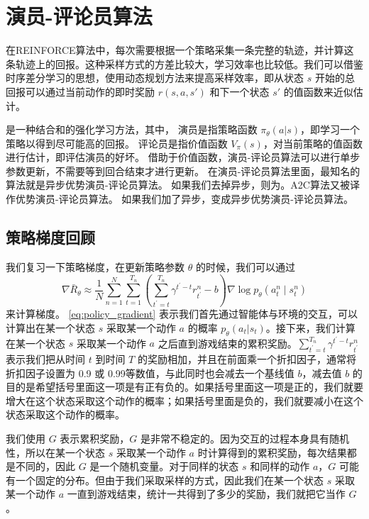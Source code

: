 \section{演员-评论员算法}
在REINFORCE算法中，每次需要根据一个策略采集一条完整的轨迹，并计算这条轨迹上的回报。这种采样方式的方差比较大，学习效率也比较低。我们可以借鉴时序差分学习的思想，使用动态规划方法来提高采样效率，即从状态 $s$ 开始的总回报可以通过当前动作的即时奖励 $r(s,a,s')$ 和下一个状态 $s'$ 的值函数来近似估计。

是一种结合和的强化学习方法，其中，
演员是指策略函数 $\pi_{\theta}(a|s)$，即学习一个策略以得到尽可能高的回报。
评论员是指价值函数 $V_{\pi}(s)$，对当前策略的值函数进行估计，即评估演员的好坏。
借助于价值函数，演员-评论员算法可以进行单步参数更新，不需要等到回合结束才进行更新。
在演员-评论员算法里面，最知名的算法就是异步优势演员-评论员算法。
如果我们去掉异步，则为。A2C算法又被译作优势演员-评论员算法。
如果我们加了异步，变成异步优势演员-评论员算法。

\subsection{策略梯度回顾} 
我们复习一下策略梯度，在更新策略参数 $\theta$ 的时候，我们可以通过
\begin{equation}
  \label{eq:policy_gradient}
  \nabla \bar{R}_{\theta} \approx \frac{1}{N} \sum_{n=1}^{N} \sum_{t=1}^{T_{n}}\left(\sum_{t^{\prime}=t}^{T_{n}} \gamma^{t^{\prime}-t} r_{t^{\prime}}^{n}-b\right) \nabla \log p_{\theta}\left(a_{t}^{n} \mid s_{t}^{n}\right)
\end{equation}
来计算梯度。
\eqref{eq:policy_gradient} 表示我们首先通过智能体与环境的交互，可以计算出在某一个状态 $s$ 采取某一个动作 $a$ 的概率  $p_{\theta}(a_t|s_t)$。接下来，我们计算在某一个状态 $s$ 采取某一个动作 $a$ 之后直到游戏结束的累积奖励。$\sum_{t^{\prime}=t}^{T_{n}} \gamma^{t^{\prime}-t} r_{t^{\prime}}^{n}$ 表示我们把从时间 $t$ 到时间 $T$ 的奖励相加，并且在前面乘一个折扣因子，通常将折扣因子设置为 0.9 或 0.99等数值，与此同时也会减去一个基线值 $b$，减去值 $b$ 的目的是希望括号里面这一项是有正有负的。如果括号里面这一项是正的，我们就要增大在这个状态采取这个动作的概率；如果括号里面是负的，我们就要减小在这个状态采取这个动作的概率。

我们使用 $G$ 表示累积奖励，$G$ 是非常不稳定的。因为交互的过程本身具有随机性，所以在某一个状态 $s$ 采取某一个动作 $a$ 时计算得到的累积奖励，每次结果都是不同的，因此 $G$ 是一个随机变量。对于同样的状态 $s$ 和同样的动作 $a$，$G$ 可能有一个固定的分布。但由于我们采取采样的方式，因此我们在某一个状态 $s$ 采取某一个动作 $a$ 一直到游戏结束，统计一共得到了多少的奖励，我们就把它当作 $G$。

